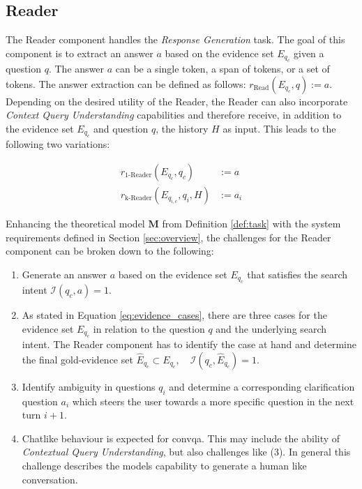 \subsection{Reader}
\label{subsec:reader}

The Reader component handles the \textit{Response Generation} task. The goal of this component is to extract an answer $a$ based on the evidence set $E_{q_c}$ given a question $q$. The answer $a$ can be a single token, a span of tokens, or a set of tokens. The answer extraction can be defined as follows: $r_{\text{Read}}(E_{q_c}, q) := a$. Depending on the desired utility of the Reader, the Reader can also incorporate \textit{Context Query Understanding} capabilities and therefore receive, in addition to the evidence set $E_{q_c}$ and question $q$, the history $H$ as input. This leads to the following two variations:

\begin{align}
    r_{\text{1-Reader}}(E_{q_c}, q_c) &:= a \label{eq:reader} \\
    r_{\text{k-Reader}}(E_{q_{i,c}}, q_{i}, H) &:= a_{i} \label{eq:reader_context}
\end{align}

Enhancing the theoretical model $\mathbf{M}$ from Definition \ref{def:task} with the system requirements defined in Section \ref{sec:overview}, the challenges for the Reader component can be broken down to the following:

\begin{enumerate}
    \item Generate an answer $a$ based on the evidence set $E_{q_c}$ that satisfies the search intent $\mathcal{I}(q_c, a) = 1$.
    \item As stated in Equation \ref{eq:evidence_cases}, there are three cases for the evidence set $E_{q_c}$ in relation to the question $q$ and the underlying search intent. The Reader component has to identify the case at hand and determine the final gold-evidence set $\hat{E}_{q_c} \subset E_{q_c}, \quad \mathcal{I}(q_c, \hat{E}_{q_c}) = 1$.
    \item Identify ambiguity in questions $q_{i}$ and determine a corresponding clarification question $a_{i}$ which steers the user towards a more specific question in the next turn $i+1$.
    \item Chatlike behaviour is expected for \gls{convqa}. This may include the ability of \textit{Contextual Query Understanding}, but also challenges like (3). In general this challenge describes the models capability to generate a human like conversation. 
\end{enumerate}

